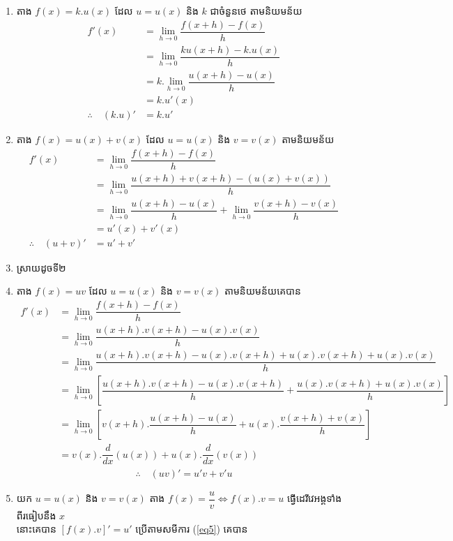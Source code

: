 \documentclass[12pt,fleqn]{book} %
\begin{document}
\begin{enumerate} 
\item តាង $f(x)=k.u(x)$  ដែល $u=u(x)$ និង $k$ ជាចំនួនថេ តាមនិយមន័យ
 \begin{align*}
  f'(x)&=\lim_{h\to 0}\dfrac{f(x+h)-f(x)}{h}\\
 &=\lim_{h\to 0}\dfrac{ku(x+h)-k.u(x) }{h}\\
 &=k.\lim_{h\to 0}\dfrac{u(x+h)-u(x)}{h}\\
 &=k.u'(x)\\
 \therefore \quad (k.u)'&=k.u'
 \end{align*}
\item តាង $f(x)=u(x)+ v(x)$  ដែល $u=u(x)$ និង $v=v(x)$ តាមនិយមន័យ
 \begin{align*}
  f'(x)&=\lim_{h\to 0}\dfrac{f(x+h)-f(x)}{h}\\
 &=\lim_{h\to 0}\dfrac{u(x+h)+ v(x+h)-(u(x)+ v(x)) }{h}\\
 &=\lim_{h\to 0}\dfrac{u(x+h)-u(x)}{h}+\lim_{h\to 0}\dfrac{v(x+h)-v(x)}{h}\\
 &=u'(x)+v'(x)\\
 \therefore \quad (u+v)'&=u'+v'
 \end{align*}
 \item ស្រាយដូចទី២
 \item តាង $f(x)=uv$ ដែល $u=u(x)$ និង $v=v(x)$ តាមនិយមន័យគេបាន
 \begin{align*}
 f'(x)&=\lim_{h\to 0}\dfrac{f(x+h)-f(x)}{h}\\
 &=\lim_{h\to 0}\dfrac{u(x+h).v(x+h)-u(x).v(x)}{h}\\
 &=\lim_{h\to 0}\dfrac{u(x+h).v(x+h)-u(x).v(x+h)+u(x).v(x+h)+u(x).v(x)}{h}\\
 &=\lim_{h\to 0}\left[\dfrac{u(x+h).v(x+h)-u(x).v(x+h)}{h}+\dfrac{u(x).v(x+h)+u(x).v(x)}{h}\right]\\
  &=\lim_{h\to 0}\left[v(x+h).\dfrac{u(x+h)-u(x)}{h}+u(x).\dfrac{v(x+h)+v(x)}{h}\right]\\
  &=v(x).\dfrac{d}{dx}(u(x))+u(x).\dfrac{d}{dx}(v(x))
 \end{align*}
 \begin{align}\label{eq5}
 \therefore\quad (uv)'=u'v+v'u
 \end{align}
 \item យក $u=u(x)$ និង $v=v(x)$ តាង $f(x)=\dfrac{u}{v}\Leftrightarrow f(x).v=u$ ធ្វើដេរីវេអង្គទាំងពីរធៀបនឹង $x$ \\
 នោះគេបាន $[f(x).v]'=u'$ ប្រើតាមសមីការ (\ref{eq5}) គេបាន
\begin{align*}

\end{align*}
\end{enumerate}
\end{document}

